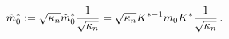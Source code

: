 \begin{equation}
\hat{m}_{0}^{\ast }:=\sqrt{\kappa _{n}}\tilde{m}_{0}^{\ast }{\frac{1}{\sqrt{%
\kappa _{n}}}}=\sqrt{\kappa _{n}}K^{\ast -1}m_{0}K^{\ast }{\frac{1}{\sqrt{%
\kappa _{n}}}}\,.
\end{equation}


